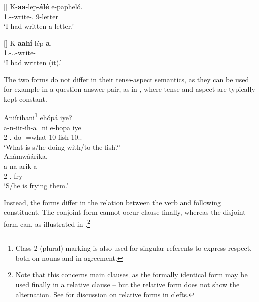 \documentclass[output=paper]{langscibook}
\begin{document}
\ea
\label{cjdjppfv}
\begin{xlist}
\exi{\CJ}
[]{
\gll
K-\textbf{aa}-lep-\textbf{álé} e-papheló.\\
1\SG{}.\SM{}-\PST{}-write-\PFV{}.\CJ{}  9-letter\\
\glt
‘I had written a letter.’\\
}

\exi{\DJ}
[]{
\gll
K-\textbf{aahí}-lép-\textbf{a}.\\
1\SG{}.\SM{}-\PST{}.\PFV{}.\DJ{}-write-\FV{}\\
\glt
‘I had written (it).’\\
}

\end{xlist}
\z


The two forms do not differ in their tense-aspect semantics, as they can be used for example in a question-answer pair, as in , where tense and aspect are typically kept constant.

\ea
\label{bkm:Ref95489793}
\begin{xlist}[Q (\CJ)]
Aniíríhani\footnote{Class 2 (plural) marking is also used for singular referents to express respect, both on nouns and in agreement.} ehópá iye?\\
\gll
a-n-iir-ih-a=ni  e-hopa  iye\\
2\SM{}-\PRS.\CJ{}-do-\CAUS{}-\FV{}=what  10-fish  10.\DEM{}.\DIST{}\\
\glt
‘What is s/he doing with/to the fish?’\\

Anámwááríka.\\
\gll
a-na-arik-a\\
2\SM{}-\PRS{}.\DJ{}-fry-\FV{}\\
\glt ‘S/he is frying them.’
\end{xlist}
\z

Instead, the forms differ in the relation between the verb and following constituent. The conjoint form cannot occur clause-finally, whereas the disjoint form can, as illustrated in .\footnote{Note that this concerns main clauses, as the formally identical form may be used finally in a relative clause – but the relative form does not show the alternation. See  for discussion on relative forms in clefts.} 
\end{document}
